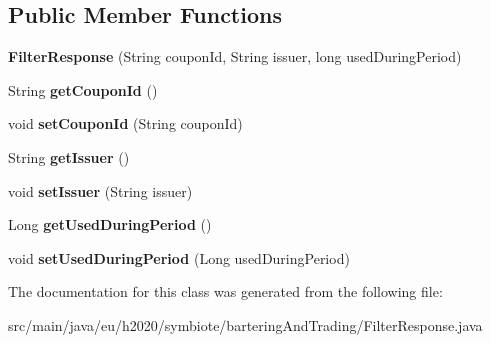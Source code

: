 \subsection*{Public Member Functions}
\begin{DoxyCompactItemize}
\item 
\mbox{\label{classeu_1_1h2020_1_1symbiote_1_1barteringAndTrading_1_1FilterResponse_aa625ce007f3a748f6760f456c8a9ab63}} 
{\bfseries Filter\+Response} (String coupon\+Id, String issuer, long used\+During\+Period)
\item 
\mbox{\label{classeu_1_1h2020_1_1symbiote_1_1barteringAndTrading_1_1FilterResponse_a4e51e311d7da2feabfc7bc330bd4d133}} 
String {\bfseries get\+Coupon\+Id} ()
\item 
\mbox{\label{classeu_1_1h2020_1_1symbiote_1_1barteringAndTrading_1_1FilterResponse_ae9a911bb4ebf71457eb499dcd58c26ee}} 
void {\bfseries set\+Coupon\+Id} (String coupon\+Id)
\item 
\mbox{\label{classeu_1_1h2020_1_1symbiote_1_1barteringAndTrading_1_1FilterResponse_abc827c3f12ed5b79a2375761be0c3b08}} 
String {\bfseries get\+Issuer} ()
\item 
\mbox{\label{classeu_1_1h2020_1_1symbiote_1_1barteringAndTrading_1_1FilterResponse_abb5997500e619da4e1871f5c4d09e7bb}} 
void {\bfseries set\+Issuer} (String issuer)
\item 
\mbox{\label{classeu_1_1h2020_1_1symbiote_1_1barteringAndTrading_1_1FilterResponse_a267c0079b42edb8722f4ec96ae3fc215}} 
Long {\bfseries get\+Used\+During\+Period} ()
\item 
\mbox{\label{classeu_1_1h2020_1_1symbiote_1_1barteringAndTrading_1_1FilterResponse_ac6815d16214cc7dbf2a37dfce526ae90}} 
void {\bfseries set\+Used\+During\+Period} (Long used\+During\+Period)
\end{DoxyCompactItemize}


The documentation for this class was generated from the following file\+:\begin{DoxyCompactItemize}
\item 
src/main/java/eu/h2020/symbiote/bartering\+And\+Trading/Filter\+Response.\+java\end{DoxyCompactItemize}
